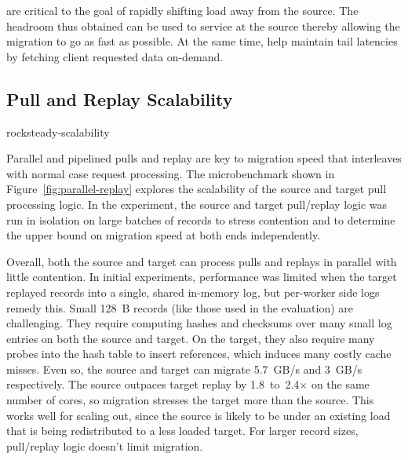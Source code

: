 \priopulls are critical to the goal of
rapidly shifting load away from the source. The headroom thus
obtained can be used to service \pulls at the source thereby allowing
the migration to go as fast as possible. At the same time, \priopulls
help maintain tail latencies by fetching client requested data
on-demand.

\subsection{Pull and Replay Scalability}
\label{sec:eval-replay}

 {rocksteady-scalability}

Parallel and pipelined pulls and replay are key to migration speed that
interleaves with normal case request processing.  The microbenchmark shown in
Figure~\ref{fig:parallel-replay} explores the scalability of the source and
target pull processing logic. In the experiment, the source and target
pull/replay logic was run in isolation on large batches of records to stress
contention and to determine the upper bound on migration speed at both ends
independently.

Overall, both the source and target can process pulls and replays in parallel with
little contention. In initial experiments, performance was limited when the
target replayed records into a single, shared in-memory log, but per-worker side logs
remedy this. Small 128~B records (like those used in the evaluation) are
challenging. They require computing hashes and checksums over many small log
entries on both the source and target. On the target, they also require many
probes into the hash table to insert references, which induces many costly
cache misses. Even so, the source and target can migrate 5.7~GB/s and
3~GB/s
respectively. The source outpaces target replay by 1.8~to~2.4$\times$ on the
same number of cores, so migration stresses the target more than the source.
This works well for scaling out, since the source is likely to be under an
existing load that is being redistributed to a less loaded target. For larger
record sizes, pull/replay logic doesn't limit migration.

